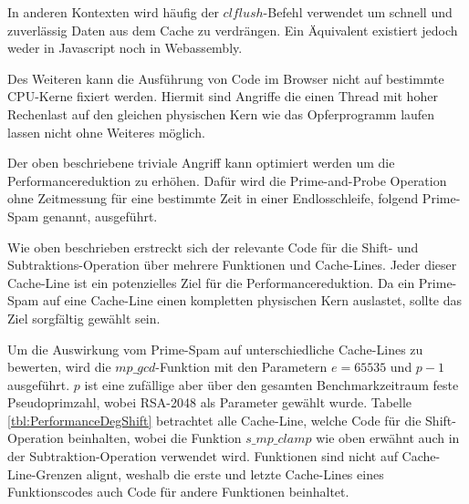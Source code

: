 In anderen Kontexten wird häufig der $clflush$-Befehl verwendet um schnell und zuverlässig Daten aus dem Cache zu verdrängen. 
Ein Äquivalent existiert jedoch weder in Javascript noch in Webassembly.

Des Weiteren kann die Ausführung von Code im Browser nicht auf bestimmte CPU-Kerne fixiert werden. Hiermit sind Angriffe die einen Thread mit hoher Rechenlast auf den gleichen physischen Kern wie das Opferprogramm laufen lassen nicht ohne Weiteres möglich.

Der oben beschriebene triviale Angriff kann optimiert werden um die Performancereduktion zu erhöhen. Dafür wird die Prime-and-Probe Operation ohne Zeitmessung für eine bestimmte Zeit in einer Endlosschleife, folgend Prime-Spam genannt, ausgeführt.

Wie oben beschrieben erstreckt sich der relevante Code für die Shift- und Subtraktions-Operation über mehrere Funktionen und Cache-Lines.
Jeder dieser Cache-Line ist ein potenzielles Ziel für die Performancereduktion.
Da ein Prime-Spam auf eine Cache-Line einen kompletten physischen Kern auslastet, sollte das Ziel sorgfältig gewählt sein.

Um die Auswirkung vom Prime-Spam auf unterschiedliche Cache-Lines zu bewerten, wird die $mp\_gcd$-Funktion mit den Parametern $e=65535$ und $p-1$ ausgeführt.
$p$ ist eine zufällige aber über den gesamten Benchmarkzeitraum feste Pseudoprimzahl, wobei RSA-2048 als Parameter gewählt wurde.
Tabelle \ref{tbl:PerformanceDegShift} betrachtet alle Cache-Line, welche Code für die Shift-Operation beinhalten, wobei die Funktion $s\_mp\_clamp$ wie oben erwähnt auch in der Subtraktion-Operation verwendet wird.
Funktionen sind nicht auf Cache-Line-Grenzen alignt, weshalb die erste und letzte Cache-Lines eines Funktionscodes auch Code für andere Funktionen beinhaltet.

